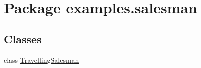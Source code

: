 \hypertarget{namespaceexamples_1_1salesman}{\section{Package examples.\-salesman}
\label{namespaceexamples_1_1salesman}
}
\subsection*{Classes}
\begin{DoxyCompactItemize}
\item 
class \hyperlink{classexamples_1_1salesman_1_1_travelling_salesman}{Travelling\-Salesman}
\end{DoxyCompactItemize}
